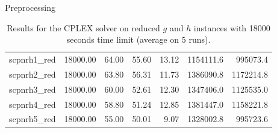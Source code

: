 \documentclass[a4paper,12pt]{mydeitesi_eng}
\begin{document}
\begin{chapter}{Preprocessing}
\begin{table}[H]
\begin{center}
\begin{tabular}{l|r|r|r|r|r|r}
scpnrh1\_red & 18000.00 &  64.00 &  55.60 & 13.12 & 1154111.6 & 995073.4 \\
scpnrh2\_red & 18000.00 &  63.80 &  56.31 & 11.73 & 1386090.8 & 1172214.8 \\
scpnrh3\_red & 18000.00 &  60.00 &  52.61 & 12.30 & 1347406.0 & 1125535.0 \\
scpnrh4\_red & 18000.00 &  58.80 &  51.24 & 12.85 & 1381447.0 & 1158221.8 \\
scpnrh5\_red & 18000.00 &  55.00 &  50.01 &  9.07 & 1328002.8 & 995723.6 \\
\end{tabular}
\end{center}
\caption{Results for the CPLEX solver on reduced $g$ and $h$ instances with 18000 seconds time limit (average on 5  runs).}
\label{tab:Preprocessing18000SecRedRun}
\end{table}
\end{chapter}



\newpage
\thispagestyle{empty}
\mbox{}
\end{document}
